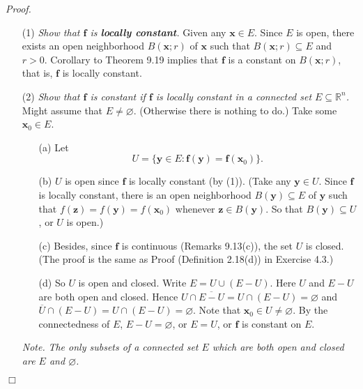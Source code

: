 \documentclass{article}
\begin{document}
\emph{Proof.}
\begin{enumerate}
\item[(1)]
  \emph{Show that $\mathbf{f}$ is \textbf{locally constant}.}
  Given any $\mathbf{x} \in E$.
  Since $E$ is open, there exists an open neighborhood $B(\mathbf{x};r)$ of $\mathbf{x}$
  such that $B(\mathbf{x};r) \subseteq E$ and $r > 0$.
  Corollary to Theorem 9.19 implies that
  $\mathbf{f}$ is a constant on $B(\mathbf{x};r)$, that is,
  $\mathbf{f}$ is locally constant.

\item[(2)]
  \emph{Show that $\mathbf{f}$ is constant
  if $\mathbf{f}$ is locally constant in a connected set $E \subseteq \mathbb{R}^n$.}
  Might assume that $E \neq \varnothing$. (Otherwise there is nothing to do.)
  Take some $\mathbf{x}_0 \in E$.
  \begin{enumerate}
  \item[(a)]
    Let
    \[
      U = \{ \mathbf{y} \in E : \mathbf{f}(\mathbf{y}) = \mathbf{f}(\mathbf{x}_0) \}.
    \]

  \item[(b)]
    $U$ is open since $\mathbf{f}$ is locally constant (by (1)).
    (Take any $\mathbf{y} \in U$.
    Since $\mathbf{f}$ is locally constant,
    there is an open neighborhood $B(\mathbf{y}) \subseteq E$
    of $\mathbf{y}$ such that $f(\mathbf{z}) = f(\mathbf{y}) = f(\mathbf{x}_0)$
    whenever $\mathbf{z} \in B(\mathbf{y})$.
    So that $B(\mathbf{y}) \subseteq U$, or $U$ is open.)

  \item[(c)]
    Besides, since $\mathbf{f}$ is continuous (Remarks 9.13(c)),
    the set $U$ is closed.
    (The proof is the same as Proof (Definition 2.18(d)) in Exercise 4.3.)

  \item[(d)]
    So $U$ is open and closed.
    Write $E = U \cup (E - U)$.
    Here $U$ and $E - U$ are both open and closed.
    Hence $U \cap \overline{E-U} = U \cap (E-U) = \varnothing$
    and $\overline{U} \cap (E-U) = U \cap (E-U) = \varnothing$.
    Note that $\mathbf{x}_0 \in U \neq \varnothing$.
    By the connectedness of $E$, $E-U = \varnothing$, or $E = U$,
    or $\mathbf{f}$ is constant on $E$.
  \end{enumerate}

  \emph{Note.}
  \emph{The only subsets of a connected set $E$ which are both open and closed
  are $E$ and $\varnothing$.}

\end{enumerate}
$\Box$ \\\\
\end{document}
